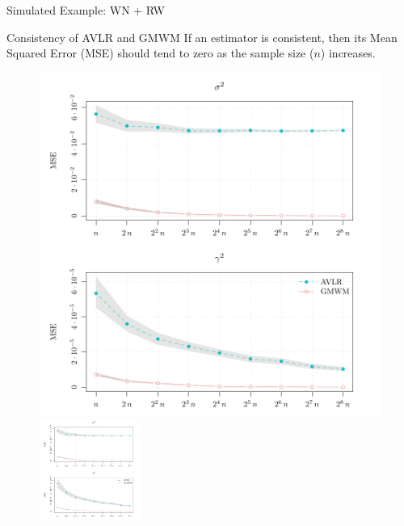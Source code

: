 \documentclass[envcountsect,usenames,dvipsnames]{beamer}
\theoremstyle{mystyle}
\begin{document}
\begin{frame}{Simulated Example: WN + RW}
    
\begin{block}{Consistency of AVLR and GMWM}
If an estimator is consistent, then its Mean Squared Error (MSE) should tend to zero as the sample size ($n$) increases.
\end{block}

\begin{figure}
    \centering
    \includegraphics[scale=0.45, valign=t]{Images/figure2Lim_wn.pdf}\,\includegraphics[height = 3.3cm, valign=t]{Images/figure2Lim_rw.pdf}
\end{figure} 
    
\end{frame}
\end{document}
